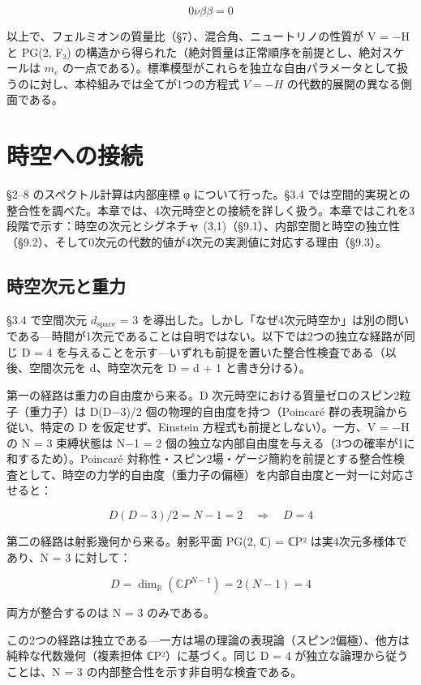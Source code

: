 \documentclass[fontsize=11pt,paper=a4,lualatex]{jlreq}
\begin{document}
\[0\nu\beta\beta = 0\]


以上で、フェルミオンの質量比（§7）、混合角、ニュートリノの性質が V = −H と PG(2, F₃) の構造から得られた（絶対質量は正常順序を前提とし、絶対スケールは $m_e$ の一点である）。標準模型がこれらを独立な自由パラメータとして扱うのに対し、本枠組みでは全てが1つの方程式 $V = -H$ の代数的展開の異なる側面である。

\section{時空への接続}\label{ux6642ux7a7aux3078ux306eux63a5ux7d9a}

§2--8 のスペクトル計算は内部座標 φ について行った。§3.4 では空間的実現との整合性を調べた。本章では、4次元時空との接続を詳しく扱う。本章ではこれを3段階で示す：時空の次元とシグネチャ (3,1)（§9.1）、内部空間と時空の独立性（§9.2）、そして0次元の代数的値が4次元の実測値に対応する理由（§9.3）。

\subsection{時空次元と重力}\label{ux6642ux7a7aux6b21ux5143ux3068ux91cdux529b}

§3.4 で空間次元 $d_{\mathrm{space}}$ = 3
を導出した。しかし「なぜ4次元時空か」は別の問いである---時間が1次元であることは自明ではない。以下では2つの独立な経路が同じ D = 4 を与えることを示す---いずれも前提を置いた整合性検査である（以後、空間次元を d、時空次元を D = d + 1 と書き分ける）。

第一の経路は重力の自由度から来る。D 次元時空における質量ゼロのスピン2粒子（重力子）は D(D−3)/2 個の物理的自由度を持つ（Poincaré 群の表現論から従い、特定の D を仮定せず、Einstein 方程式も前提としない）。一方、V = −H の N = 3 束縛状態は N−1 = 2 個の独立な内部自由度を与える（3つの確率が1に和するため）。Poincaré 対称性・スピン2場・ゲージ簡約を前提とする整合性検査として、時空の力学的自由度（重力子の偏極）を内部自由度と一対一に対応させると：

\[D(D−3)/2 = N − 1 = 2 \quad \Longrightarrow \quad D = 4\]

第二の経路は射影幾何から来る。射影平面 PG(2, ℂ) = ℂP² は実4次元多様体であり、N = 3 に対して：

\[D = \dim_\mathbb{R}(\mathbb{C}P^{N-1}) = 2(N-1) = 4\]

両方が整合するのは N = 3 のみである。

この2つの経路は独立である---一方は場の理論の表現論（スピン2偏極）、他方は純粋な代数幾何（複素担体 ℂP²）に基づく。同じ D = 4 が独立な論理から従うことは、N = 3 の内部整合性を示す非自明な検査である。
\end{document}

